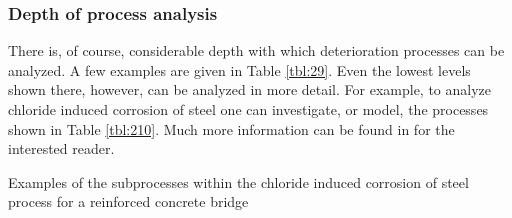 \subsubsection{Depth of process analysis}

There is, of course, considerable depth with which deterioration processes can be analyzed. A few examples are given in Table \ref{tbl:29}. Even the lowest levels shown there, however, can be analyzed in more detail. For example, to analyze chloride induced corrosion of steel one can investigate, or model, the processes shown in Table \ref{tbl:210}. Much more information can be found in \cite{Elsener2013} for the interested reader.


{\raggedright

\begin{table}[h]
\caption{Examples of the subprocesses within the chloride induced corrosion of steel process for a reinforced concrete bridge}


\end{table}}
